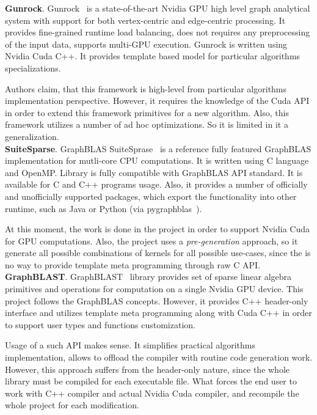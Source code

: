 \textbf{Gunrock}. Gunrock~\cite{article:gunrock} is a state-of-the-art Nvidia GPU high level graph analytical system with support for both vertex-centric and edge-centric processing. It provides fine-grained runtime load balancing, does not requires any preprocessing of the input data, supports multi-GPU execution. Gunrock is written using Nvidia Cuda C++. It provides template based model for particular algorithms specializations. 

Authors claim, that this framework is high-level from particular algorithms implementation perspective. However, it requires the knowledge of the Cuda API in order to extend this framework primitives for a new algorithm. Also, this framework utilizes a number of ad hoc optimizations. So it is limited in it a generalization.\\

\textbf{SuiteSparse}. GraphBLAS SuiteSprase~\cite{article:suite_sparse_for_graph_problems} is a reference fully featured GraphBLAS implementation for mutli-core CPU computations. It is written using C language and OpenMP. Library is fully compatible with GraphBLAS API standard. It is available for C and C++ programs usage. Also, it provides a number of officially and unofficially supported packages, which export the functionality into other runtime, such as Java or Python (via pygraphblas~\cite{net:pygraphblas}).

At this moment, the work is done in the project in order to support Nvidia Cuda for GPU computations. Also, the project uses a \textit{pre-generation} approach, so it generate all possible combinations of kernels for all possible use-cases, since the is no way to provide template meta programming through raw C API.\\

\textbf{GraphBLAST}. GraphBLAST~\cite{yang2019graphblast} library provides set of sparse linear algebra primitives and operations for computation on a single Nvidia GPU device. This project follows the GraphBLAS concepts. However, it provides C++ header-only interface and utilizes template meta programming along with Cuda C++ in order to support user types and functions customization. 

Usage of a such API makes sense. It simplifies practical algorithms implementation, allows to offload the compiler with routine code generation work. However, this approach suffers from the header-only nature, since the whole library must be compiled for each executable file. What forces the end user to work with C++ compiler and actual Nvidia Cuda compiler, and recompile the whole project for each modification. 

